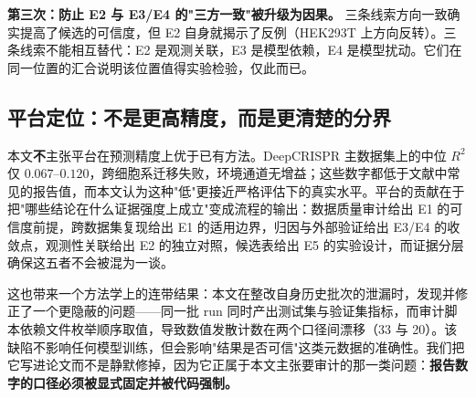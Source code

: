 \textbf{第三次：防止 E2 与 E3/E4 的"三方一致"被升级为因果。} 三条线索方向一致确实提高了候选的可信度，但 E2 自身就揭示了反例（HEK293T 上方向反转）。三条线索不能相互替代：E2 是观测关联，E3 是模型依赖，E4 是模型扰动。它们在同一位置的汇合说明该位置值得实验检验，仅此而已。

\subsection{平台定位：不是更高精度，而是更清楚的分界}

本文\textbf{不}主张平台在预测精度上优于已有方法。DeepCRISPR 主数据集上的中位 $R^{2}$ 仅 $0.067$--$0.120$，跨细胞系迁移失败，环境通道无增益；这些数字都低于文献中常见的报告值，而本文认为这种"低"更接近严格评估下的真实水平。平台的贡献在于把"哪些结论在什么证据强度上成立"变成流程的输出：数据质量审计给出 E1 的可信度前提，跨数据集复现给出 E1 的适用边界，归因与外部验证给出 E3/E4 的收敛点，观测性关联给出 E2 的独立对照，候选表给出 E5 的实验设计，而证据分层确保这五者不会被混为一谈。

这也带来一个方法学上的连带结果：本文在整改自身历史批次的泄漏时，发现并修正了一个更隐蔽的问题——同一批 run 同时产出测试集与验证集指标，而审计脚本依赖文件枚举顺序取值，导致数值发散计数在两个口径间漂移（33 与 20）。该缺陷不影响任何模型训练，但会影响"结果是否可信"这类元数据的准确性。我们把它写进论文而不是静默修掉，因为它正属于本文主张要审计的那一类问题：\textbf{报告数字的口径必须被显式固定并被代码强制。}
